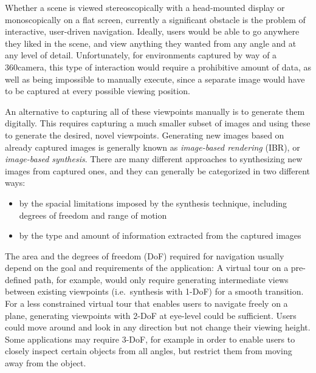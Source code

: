 Whether a scene is viewed stereoscopically with a head-mounted display or monoscopically on a flat screen, currently a significant obstacle is the problem of interactive, user-driven navigation. Ideally, users would be able to go anywhere they liked in the scene, and view anything they wanted from any angle and at any level of detail. Unfortunately, for environments captured by way of a 360\degree camera, this type of interaction would require a prohibitive amount of data, as well as being impossible to manually execute, since a separate image would have to be captured at every possible viewing position.
\newpage

An alternative to capturing all of these viewpoints manually is to generate them digitally. This requires capturing a much smaller subset of images and using these to generate the desired, novel viewpoints. Generating new images based on already captured images is generally known as \emph{image-based rendering} (IBR), or \emph{image-based synthesis}. There are many different approaches to synthesizing new images from captured ones, and they can generally be categorized in two different ways:
\begin{itemize}
  \item by the spacial limitations imposed by the synthesis technique, including degrees of freedom and range of motion
  \item by the type and amount of information extracted from the captured images
\end{itemize}

\noindent
The area and the degrees of freedom (DoF) required for navigation usually depend on the goal and requirements of the application: A virtual tour on a pre-defined path, for example, would only require generating intermediate views between existing viewpoints (i.e.\ synthesis with 1-DoF) for a smooth transition. For a less constrained virtual tour that enables users to navigate freely on a plane, generating viewpoints with 2-DoF at eye-level could be sufficient. Users could move around and look in any direction but not change their viewing height. Some applications may require 3-DoF, for example in order to enable users to closely inspect certain objects from all angles, but restrict them from moving away from the object.

